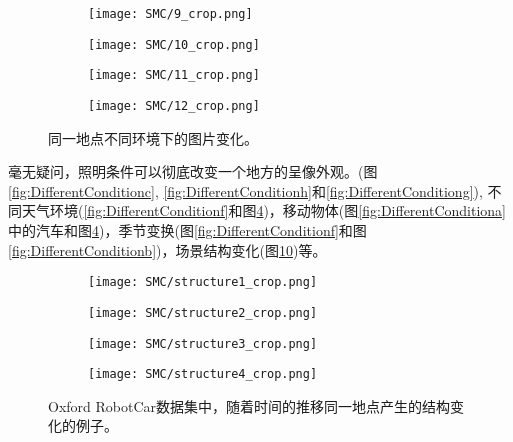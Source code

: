 \begin{figure}[h]
\begin{center}
    \begin{subfigure}[b]{0.22\textwidth}    
		\texttt{[image: SMC/9\_crop.png]}
		\caption{}
    	\label{fig:DifferentConditioni}    
	\end{subfigure} 
    \begin{subfigure}[b]{0.22\textwidth}    
		\texttt{[image: SMC/10\_crop.png]}
		\caption{}
    	\label{fig:DifferentConditionj}    
	\end{subfigure}
    \begin{subfigure}[b]{0.22\textwidth}    
		\texttt{[image: SMC/11\_crop.png]}
		\caption{}
    	\label{fig:DifferentConditionk}    
	\end{subfigure}
    \begin{subfigure}[b]{0.22\textwidth}    
		\texttt{[image: SMC/12\_crop.png]}
		\caption{}
    	\label{fig:DifferentConditionl}    
	\end{subfigure} 
	\end{center}
	\caption{同一地点不同环境下的图片变化。}
	\label{fig:DifferentCondition}
\end{figure}

毫无疑问，照明条件可以彻底改变一个地方的呈像外观。(图\ref{fig:DifferentConditionc}, \ref{fig:DifferentConditionh}和\ref{fig:DifferentConditiong}), 
不同天气环境(\ref{fig:DifferentConditionf}和图\ref{fig:DifferentConditionl})，移动物体(图\ref{fig:DifferentConditiona}
中的汽车和图\ref{fig:DifferentConditionl})，季节变换(图\ref{fig:DifferentConditionf}和图\ref{fig:DifferentConditionb})，场景结构变化(图\ref{fig:RealMatch})等。
\begin{figure}[h]
	\begin{subfigure}[b]{0.22\textwidth}
		\texttt{[image: SMC/structure1\_crop.png]}
		\label{fig:structure1}
	\end{subfigure}
	\begin{subfigure}[b]{0.22\textwidth}
		\texttt{[image: SMC/structure2\_crop.png]}
		\label{fig:structure2}
	\end{subfigure}
	\begin{subfigure}[[b]{0.22\textwidth}
		\texttt{[image: SMC/structure3\_crop.png]}
		\label{fig:structure3}
	\end{subfigure}
	\begin{subfigure}[b]{0.22\textwidth}
		\texttt{[image: SMC/structure4\_crop.png]}
		\label{fig:structure4}
	\end{subfigure}
	\caption{Oxford RobotCar数据集中，随着时间的推移同一地点产生的结构变化的例子。}
	\label{fig:RealMatch}
\end{figure}

